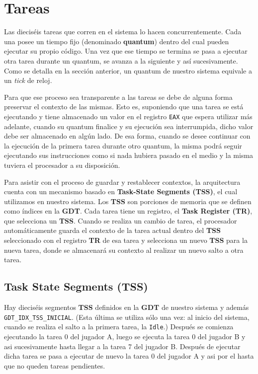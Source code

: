 \documentclass[a4paper]{article}
\begin{document}
\clearpage
\section{Tareas}
Las dieciséis tareas que corren en el sistema lo hacen concurrentemente. Cada una posee un tiempo fijo (denominado \textbf{quantum}) dentro del cual pueden ejecutar su propio código. Una vez que ese tiempo se termina se pasa a ejecutar otra tarea durante un quantum, se avanza a la siguiente y así sucesivamente. Como se detalla en la sección anterior, un quantum de nuestro sistema equivale a un \textit{tick} de reloj.

Para que ese proceso sea transparente a las tareas se debe de alguna forma preservar el contexto de las mismas. Esto es, suponiendo que una tarea se está ejecutando y tiene almacenado un valor en el registro \texttt{EAX} que espera utilizar más adelante, cuando su quantum finalice y su ejecución sea interrumpida, dicho valor debe ser almacenado en algún lado. De esa forma, cuando se desee continuar con la ejecución de la primera tarea durante otro quantum, la misma podrá seguir ejecutando sus instrucciones como si nada hubiera pasado en el medio y la misma tuviera el procesador a su disposición.

Para asistir con el proceso de guardar y restablecer contextos, la arquitectura cuenta con un mecanismo basado en \textbf{Task-State Segments (TSS)}, el cual utilizamos en nuestro sistema. Los \textbf{TSS} son porciones de memoria que se definen como índices en la \textbf{GDT}. Cada tarea tiene un registro, el \textbf{Task Register (TR)}, que selecciona un \textbf{TSS}. Cuando se realiza un cambio de tarea, el procesador automáticamente guarda el contexto de la tarea actual dentro del \textbf{TSS} seleccionado con el registro \textbf{TR} de esa tarea y selecciona un nuevo \textbf{TSS} para la nueva tarea, donde se almacenará su contexto al realizar un nuevo salto a otra tarea.



\subsection{Task State Segments (TSS)}
Hay dieciséis segmentos \textbf{TSS} definidos en la \textbf{GDT} de nuestro sistema y además \texttt{GDT_IDX_TSS_INICIAL}. (Esta última se utiliza sólo una vez: al inicio del sistema, cuando se realiza el salto a la primera tarea, la \texttt{Idle}.) 
Después se comienza ejecutando la tarea 0 del jugador A, luego se ejecuta la tarea 0 del jugador B y asi sucesivamente hasta llegar a la tarea 7 del jugador B. Después de ejecutar dicha tarea se pasa a ejecutar de nuevo la tarea 0 del jugador A y asi por el hasta que no queden tareas pendientes.
\end{document}

